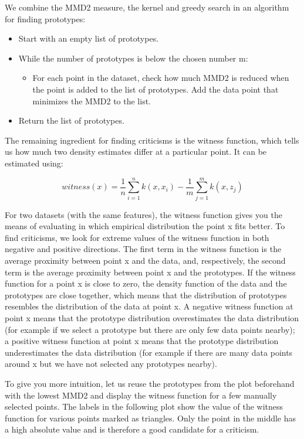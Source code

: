\documentclass[
  12pt,
]{krantz}
\providecommand{\tightlist}{%
  \setlength{\itemsep}{0pt}\setlength{\parskip}{0pt}}
\begin{document}
We combine the MMD2 measure, the kernel and greedy search in an algorithm for finding prototypes:

\begin{itemize}
\tightlist
\item
  Start with an empty list of prototypes.
\item
  While the number of prototypes is below the chosen number m:

  \begin{itemize}
  \tightlist
  \item
    For each point in the dataset, check how much MMD2 is reduced when the point is added to the list of prototypes. Add the data point that minimizes the MMD2 to the list.
  \end{itemize}
\item
  Return the list of prototypes.
\end{itemize}

The remaining ingredient for finding criticisms is the witness function, which tells us how much two density estimates differ at a particular point.
It can be estimated using:

\[witness(x)=\frac{1}{n}\sum_{i=1}^nk(x,x_i)-\frac{1}{m}\sum_{j=1}^mk(x,z_j)\]

For two datasets (with the same features), the witness function gives you the means of evaluating in which empirical distribution the point x fits better.
To find criticisms, we look for extreme values of the witness function in both negative and positive directions.
The first term in the witness function is the average proximity between point x and the data, and, respectively, the second term is the average proximity between point x and the prototypes.
If the witness function for a point x is close to zero, the density function of the data and the prototypes are close together, which means that the distribution of prototypes resembles the distribution of the data at point x.
A negative witness function at point x means that the prototype distribution overestimates the data distribution (for example if we select a prototype but there are only few data points nearby);
a positive witness function at point x means that the prototype distribution underestimates the data distribution (for example if there are many data points around x but we have not selected any prototypes nearby).

To give you more intuition, let us reuse the prototypes from the plot beforehand with the lowest MMD2 and display the witness function for a few manually selected points.
The labels in the following plot show the value of the witness function for various points marked as triangles.
Only the point in the middle has a high absolute value and is therefore a good candidate for a criticism.
\end{document}
